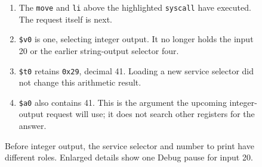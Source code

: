 \begin{figure}[htbp]
\begin{minipage}{\linewidth}
\begin{enumerate}
      \item The \texttt{move} and \texttt{li} above the highlighted \texttt{syscall} have executed. The request itself is next.
      \item \texttt{\$v0} is one, selecting integer output. It no longer holds the input 20 or the earlier string-output selector four.
      \item \texttt{\$t0} retains \texttt{0x29}, decimal 41. Loading a new service selector did not change this arithmetic result.
      \item \texttt{\$a0} also contains 41. This is the argument the upcoming integer-output request will use; it does not search other registers for the answer.
    \end{enumerate}
  \end{minipage}
  \caption{Before integer output, the service selector and number to print have different roles. Enlarged details show one Debug pause for input 20.}
  \label{fig:revision-first-program-output}
\end{figure}
